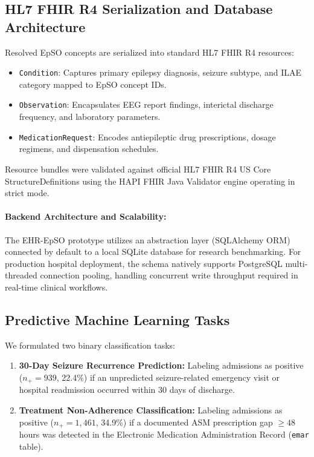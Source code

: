 \documentclass[11pt,a4paper]{article}
\begin{document}
\subsection{HL7 FHIR R4 Serialization and Database Architecture}
Resolved EpSO concepts are serialized into standard HL7 FHIR R4 resources:
\begin{itemize}[leftmargin=*, itemsep=0.2em]
    \item \texttt{Condition}: Captures primary epilepsy diagnosis, seizure subtype, and ILAE category mapped to EpSO concept IDs.
    \item \texttt{Observation}: Encapsulates EEG report findings, interictal discharge frequency, and laboratory parameters.
    \item \texttt{MedicationRequest}: Encodes antiepileptic drug prescriptions, dosage regimens, and dispensation schedules.
\end{itemize}

Resource bundles were validated against official HL7 FHIR R4 US Core StructureDefinitions using the HAPI FHIR Java Validator engine \cite{hl7fhirr4} operating in strict mode.

\paragraph{Backend Architecture and Scalability:} The EHR-EpSO prototype utilizes an abstraction layer (SQLAlchemy ORM) connected by default to a local SQLite database for research benchmarking. For production hospital deployment, the schema natively supports PostgreSQL multi-threaded connection pooling, handling concurrent write throughput required in real-time clinical workflows.

\subsection{Predictive Machine Learning Tasks}
We formulated two binary classification tasks:
\begin{enumerate}[label=\textbf{Task \arabic*:}, leftmargin=*]
    \item \textbf{30-Day Seizure Recurrence Prediction:} Labeling admissions as positive ($n_+ = 939$, 22.4\%) if an unpredicted seizure-related emergency visit or hospital readmission occurred within 30 days of discharge.
    \item \textbf{Treatment Non-Adherence Classification:} Labeling admissions as positive ($n_+ = 1,461$, 34.9\%) if a documented ASM prescription gap $\ge 48$ hours was detected in the Electronic Medication Administration Record (\texttt{emar} table).
\end{enumerate}
\end{document}
